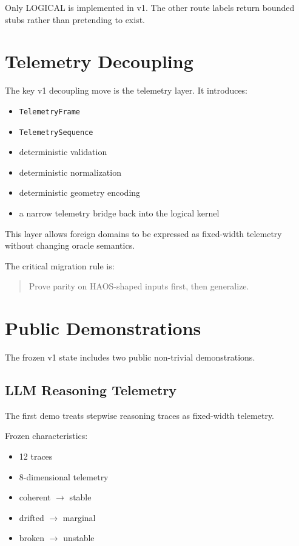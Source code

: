 \documentclass[11pt]{article}
\begin{document}
Only LOGICAL is implemented in v1.
The other route labels return bounded stubs rather than pretending to exist.

\section{Telemetry Decoupling}

The key v1 decoupling move is the telemetry layer.
It introduces:

\begin{itemize}
\item \texttt{TelemetryFrame}
\item \texttt{TelemetrySequence}
\item deterministic validation
\item deterministic normalization
\item deterministic geometry encoding
\item a narrow telemetry bridge back into the logical kernel
\end{itemize}

This layer allows foreign domains to be expressed as fixed-width telemetry without changing oracle semantics.

The critical migration rule is:

\begin{quote}
Prove parity on HAOS-shaped inputs first, then generalize.
\end{quote}

\section{Public Demonstrations}

The frozen v1 state includes two public non-trivial demonstrations.

\subsection{LLM Reasoning Telemetry}

The first demo treats stepwise reasoning traces as fixed-width telemetry.

Frozen characteristics:

\begin{itemize}
\item 12 traces
\item 8-dimensional telemetry
\item coherent $\rightarrow$ stable
\item drifted $\rightarrow$ marginal
\item broken $\rightarrow$ unstable
\end{itemize}
\end{document}
